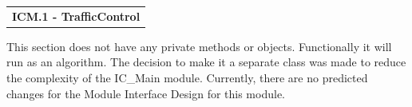 \documentclass [10pt]{article}
\begin{document}
\begin{longtable}{p{}}
\rowcolor{subsectionC}\textbf{ICM.1 - TrafficControl} \\
\end{longtable}

This section does not have any private methods or objects.  Functionally it will run as an algorithm. The decision to make it a separate class was made to reduce the complexity of the IC\_Main module. Currently, there are no predicted changes for the Module Interface Design for this module. \\



















\end{document}
